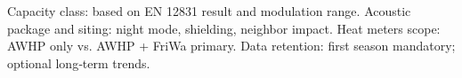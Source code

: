 {}\markdownRendererUlBeginTight
\markdownRendererUlItem Capacity class: based on EN 12831 result and modulation range.\markdownRendererUlItemEnd 
\markdownRendererUlItem Acoustic package and siting: night mode, shielding, neighbor impact.\markdownRendererUlItemEnd 
\markdownRendererUlEndTight \markdownRendererInterblockSeparator
{}
\markdownRendererSectionEnd \markdownRendererSectionBegin
{}\markdownRendererInterblockSeparator
{}\markdownRendererUlBeginTight
\markdownRendererUlItem Heat meters scope: AWHP only vs. AWHP + FriWa primary.\markdownRendererUlItemEnd 
\markdownRendererUlItem Data retention: first season mandatory; optional long‑term trends.\markdownRendererUlItemEnd 
\markdownRendererUlEndTight 
\markdownRendererSectionEnd 
\markdownRendererSectionEnd \markdownRendererDocumentEnd